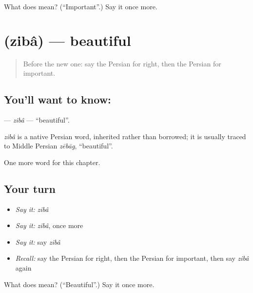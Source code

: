 \begin{tcolorbox}[breakable,colback=teal!4,colframe=teal!35!black,title={Before you move on}]
What does  mean? (\textquotedblleft{}Important\textquotedblright{}.) Say it once more.
\end{tcolorbox}
\section[\texorpdfstring{\fa{زیبا} (zibâ)}{زیبا (zibâ)}]{ (zibâ) — beautiful}

\label{lesson:FA-C63-ziba}



\begin{quote}
Before the new one: say the Persian for right, then the Persian for important.
\end{quote}

\subsection*{You'll want to know: }
\textbf{} — \emph{zibâ} — \textquotedblleft{}beautiful\textquotedblright{}.

\begin{cousinweb}
\emph{zibâ} is a native Persian word, inherited rather than borrowed; it is usually traced to Middle Persian \emph{zēbāg}, \textquotedblleft{}beautiful\textquotedblright{}.
\end{cousinweb}

\begin{grammarlens}[title={What you've built}]
One more word for this chapter.
\end{grammarlens}

\subsection*{Your turn}
\begin{itemize}
\raggedright
  \item \emph{Say it:} \emph{zibâ}
  \item \emph{Say it:} \emph{zibâ}, once more
  \item \emph{Say it:} say \emph{zibâ}
  \item \emph{Recall:} say the Persian for right, then the Persian for important, then say \emph{zibâ} again
\end{itemize}

\begin{tcolorbox}[breakable,colback=teal!4,colframe=teal!35!black,title={Before you move on}]
What does  mean? (\textquotedblleft{}Beautiful\textquotedblright{}.) Say it once more.
\end{tcolorbox}
